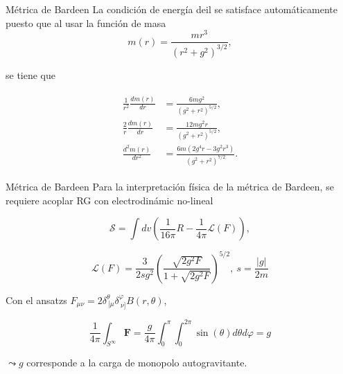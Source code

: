 \documentclass[t]{beamer}
\numberwithin{equation}{section}
\begin{document}
\begin{frame}{Métrica de Bardeen}
La condición de energía deil se satisface automáticamente puesto que al usar la función de masa
\begin{equation}
m(r) = \frac{mr^3}{(r^2 + g^2)^{3/2}},
\end{equation}

se tiene que

\begin{align}
\begin{aligned}
\frac{1}{r^2}\frac{dm(r)}{dr} &= \frac{6 m g^2}{\left(g^2+r^2\right)^{5/2}},\\
\frac{2}{r}\frac{dm(r)}{dr} &= \frac{12 m g^2 r}{\left(g^2+r^2\right)^{5/2}},\\
\frac{d^2m(r)}{dr^2} &= \frac{6 m \left(2 g^4 r-3 g^2 r^3\right)}{\left(g^2+r^2\right)^{7/2}}.
\end{aligned}
\end{align}
\end{frame}

\begin{frame}{Métrica de Bardeen}
Para la interpretación física de la métrica de Bardeen, se requiere acoplar RG con electrodinámic no-lineal \cite{ayon-beato2000}

\begin{equation}
\mathcal{S} = \int dv \left( \frac{1}{16 \pi}R - \frac{1}{4 \pi}\mathcal{L}(F) \right),
\end{equation}

\begin{equation}
\label{nonlinear bardeen}
\mathcal{L}(F) = \frac{3}{2sg^2}\left( \frac{\sqrt{2g^2F}}{1 + \sqrt{2g^2F}} \right)^{5/2},\ s = \frac{|g|}{2m}
\end{equation}

Con el ansatzs $F_{\mu \nu} = 2 \delta^{\theta}_{\ \lbrack\mu} \delta^{\varphi}_{\ \nu\rbrack} B(r, \theta)
$,

\begin{equation*}
\frac{1}{4 \pi} \int_{S^{\infty}}\mathbf{F} = \frac{g}{4 \pi} \int_{0}^{\pi}\int_{0}^{2\pi}\sin (\theta) d\theta d\varphi = g
\end{equation*}

$ \leadsto g$ corresponde a la carga de monopolo autogravitante.
\end{frame}
\end{document}
